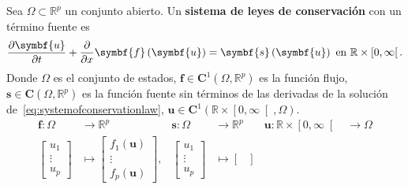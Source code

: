 \begin{definition}
	Sea $\Omega\subset\mathbb{R}^{p}$ un conjunto abierto.
	Un \textbf{sistema de leyes de conservación} con un término
	fuente es
	\begin{equation}\label{eq:systemofconservationlaw}
		\diffp{\symbf{u}}{t}+
		\diffp*{\symbf{f}\left(\symbf{u}\right)}{x}=
		\symbf{s}\left(\symbf{u}\right)
		\text{ en }\mathbb{R}\times\left[0,\infty\right[.
	\end{equation}
	Donde $\Omega$ es el conjunto de estados,
	\begin{math}
		\symbf{f}\in\symbf{C}^{1}
		\left(\Omega,\mathbb{R}^{p}\right)
	\end{math}
	es la función flujo,
	\begin{math}
		\symbf{s}\in
		\symbf{C}
		\left(\Omega,\mathbb{R}^{p}\right)
	\end{math}
	es la función fuente sin términos de las derivadas de la
	solución de~\eqref{eq:systemofconservationlaw},
	\begin{math}
		\symbf{u}\in
		\symbf{C}^{1}
		\left(\mathbb{R}\times\left[0,\infty\right[,\Omega\right)
	\end{math}.
	\begin{align*}
		\symbf{f}\colon\Omega                                &
		\longrightarrow\mathbb{R}^{p}                        &
		\symbf{s}\colon\Omega                                &
		\longrightarrow\mathbb{R}^{p}                        &
		\symbf{u}\colon\mathbb{R}\times\left[0,\infty\right[ &
		\longrightarrow\Omega                                  \\
		\begin{bmatrix}
			u_{1}  \\
			\vdots \\
			u_{p}
		\end{bmatrix}                                      &
		\longmapsto
		\begin{bmatrix}
			f_{1}\left(\symbf{u}\right) \\
			\vdots                      \\
			f_{p}\left(\symbf{u}\right)
		\end{bmatrix},                       &
		\begin{bmatrix}
			u_{1}  \\
			\vdots \\
			u_{p}
		\end{bmatrix}                                      &
		\longmapsto
		\begin{bmatrix}

\end{bmatrix}
\end{align*}
\end{definition}
